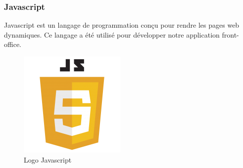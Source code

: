 \subsubsection{Javascript}
\noindent\begin{minipage}{0.69\textwidth}
Javascript est un langage de programmation conçu pour rendre les pages web dynamiques. Ce langage a été utilisé pour développer notre application front-office.
\end{minipage}
\begin{minipage}{0.3\textwidth}
\begin{figure}[H]
  \centering
  \includegraphics[scale=0.35]{figures/logo/javascript.png}
  \caption{Logo Javascript}
  \label{code44}
\end{figure}
\end{minipage}
